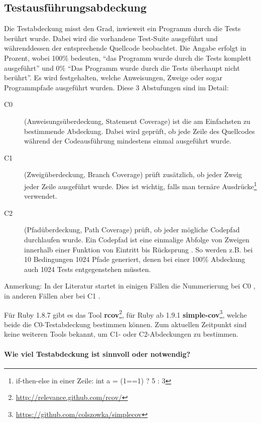 \subsection{Testausführungsabdeckung}
\label{sec:coverage}
Die Testabdeckung misst den Grad, inwieweit ein Programm durch die Tests berührt wurde. Dabei wird die vorhandene Test-Suite ausgeführt und währenddessen der entsprechende Quellcode beobachtet. Die Angabe erfolgt in Prozent, wobei 100\% bedeuten, "`das Programm wurde durch die Tests komplett ausgeführt"' und 0\% "`Das Programm wurde durch die Tests überhaupt nicht berührt"'.  Es wird festgehalten, welche Anweisungen, Zweige oder sogar Programmpfade ausgeführt wurden. Diese 3 Abstufungen sind im Detail:
\begin{description}
 \item[C0] (Anweisungsüberdeckung, Statement Coverage) ist die am Einfachsten zu bestimmende Abdeckung. Dabei wird geprüft, ob jede Zeile des Quellcodes während der Codeausführung mindestens einmal ausgeführt wurde.
 \item[C1] (Zweigüberdeckung, Branch Coverage) prüft zusätzlich, ob jeder Zweig jeder Zeile ausgeführt wurde. Dies ist wichtig, falls man ternäre Ausdrücke\footnote{if-then-else in einer Zeile: int a = (1==1) ? 5 : 3} verwendet.
 \item[C2] (Pfadüberdeckung, Path Coverage) prüft, ob jeder mögliche Codepfad durchlaufen wurde. Ein Codepfad ist eine einmalige Abfolge von Zweigen innerhalb einer Funktion von Eintritt bis Rücksprung \citep{steve_cornett_code_1996}. So werden z.B. bei 10 Bedingungen 1024 Pfade generiert, denen bei einer 100\% Abdeckung auch 1024 Tests entgegenstehen müssten.
 \end{description}
 Anmerkung: In der Literatur startet in einigen Fällen die Nummerierung bei C0 \citep{catherine_powell_abakas_2008}, in anderen Fällen aber bei C1 \citep{steve_cornett_code_1996}.

 Für Ruby 1.8.7 gibt es das Tool \textbf{rcov}\footnote{\url{http://relevance.github.com/rcov/}}, für Ruby ab 1.9.1 \textbf{simple-cov}\footnote{\url{https://github.com/colszowka/simplecov}}, welche beide die C0-Testabdeckung bestimmen können. Zum aktuellen Zeitpunkt sind keine weiteren Tools bekannt, um C1- oder C2-Abdeckungen zu bestimmen.
 \paragraph{Wie viel Testabdeckung ist sinnvoll oder notwendig?}

